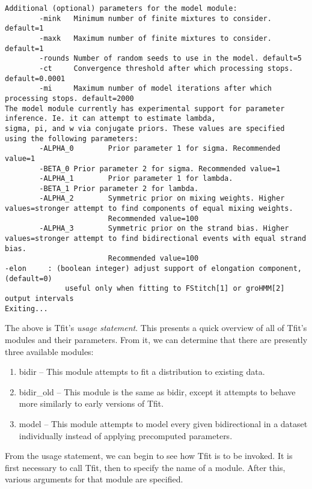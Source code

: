 \documentclass[12pt,letterpaper]{article}
\begin{document}
\begin{lstlisting}
Additional (optional) parameters for the model module:
        -mink   Minimum number of finite mixtures to consider. default=1
        -maxk   Maximum number of finite mixtures to consider. default=1
        -rounds Number of random seeds to use in the model. default=5
        -ct     Convergence threshold after which processing stops. default=0.0001
        -mi     Maximum number of model iterations after which processing stops. default=2000
The model module currently has experimental support for parameter inference. Ie. it can attempt to estimate lambda,
sigma, pi, and w via conjugate priors. These values are specified using the following parameters:
        -ALPHA_0        Prior parameter 1 for sigma. Recommended value=1
        -BETA_0 Prior parameter 2 for sigma. Recommended value=1
        -ALPHA_1        Prior parameter 1 for lambda.
        -BETA_1 Prior parameter 2 for lambda.
        -ALPHA_2        Symmetric prior on mixing weights. Higher values=stronger attempt to find components of equal mixing weights.
                        Recommended value=100
        -ALPHA_3        Symmetric prior on the strand bias. Higher values=stronger attempt to find bidirectional events with equal strand bias.
                        Recommended value=100
-elon     : (boolean integer) adjust support of elongation component, (default=0)
              useful only when fitting to FStitch[1] or groHMM[2] output intervals
Exiting...
\end{lstlisting}

The above is Tfit's \textit{usage statement}. This presents a quick overview of all of Tfit's modules and their parameters. From it, we can determine that there are presently three available modules:
\begin{enumerate}
\item bidir -- This module attempts to fit a distribution to existing data.
\item bidir\_old -- This module is the same as bidir, except it attempts to behave more similarly to early versions of Tfit.
\item model -- This module attempts to model every given bidirectional in a dataset individually instead of applying precomputed parameters.
\end{enumerate}

From the usage statement, we can begin to see how Tfit is to be invoked. It is first necessary to call Tfit, then to specify the name of a module. After this, various arguments for that module are specified.
\end{document}

